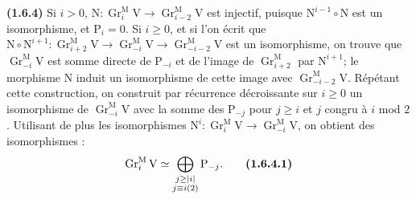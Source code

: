 \documentclass[11pt,leqno]{article}
\begin{document}
\textbf{(1.6.4)} Si \(i>0\), \(\mathrm{N}:\operatorname{Gr}_i^{\mathrm{M}}\mathrm{V}\to\operatorname{Gr}_{i-2}^{\mathrm{M}}\mathrm{V}\) est injectif, puisque \(\mathrm{N}^{i-1}\circ\mathrm{N}\) est un isomorphisme, et \(\mathrm{P}_i=0\). Si \(i\ge0\), et si l’on écrit que \(\mathrm{N}\circ\mathrm{N}^{i+1}:\operatorname{Gr}_{i+2}^{\mathrm{M}}\mathrm{V}\to\operatorname{Gr}_{-i}^{\mathrm{M}}\mathrm{V}\to\operatorname{Gr}_{-i-2}^{\mathrm{M}}\mathrm{V}\) est un isomorphisme, on trouve que \(\operatorname{Gr}_{-i}^{\mathrm{M}}\mathrm{V}\) est somme directe de \(\mathrm{P}_{-i}\) et de l’image de \(\operatorname{Gr}_{i+2}^{\mathrm{M}}\) par \(\mathrm{N}^{i+1}\); le morphisme \(\mathrm{N}\) induit un isomorphisme de cette image avec \(\operatorname{Gr}_{-i-2}^{\mathrm{M}}\mathrm{V}\). Répétant cette construction, on construit par récurrence décroissante sur \(i\ge0\) un isomorphisme de \(\operatorname{Gr}_{-i}^{\mathrm{M}}\mathrm{V}\) avec la somme des \(\mathrm{P}_{-j}\) pour \(j\ge i\) et \(j\) congru à \(i\) mod \(2\). Utilisant de plus les isomorphismes \(\mathrm{N}^i:\operatorname{Gr}_i^{\mathrm{M}}\mathrm{V}\to\operatorname{Gr}_{-i}^{\mathrm{M}}\mathrm{V}\), on obtient des isomorphismes :
\[
\operatorname{Gr}_i^{\mathrm{M}}\mathrm{V}
\simeq
\bigoplus_{\substack{j\ge|i|\\j\equiv i(2)}}\mathrm{P}_{-j}.
\tag*{\textbf{(1.6.4.1)}}
\]
\end{document}
